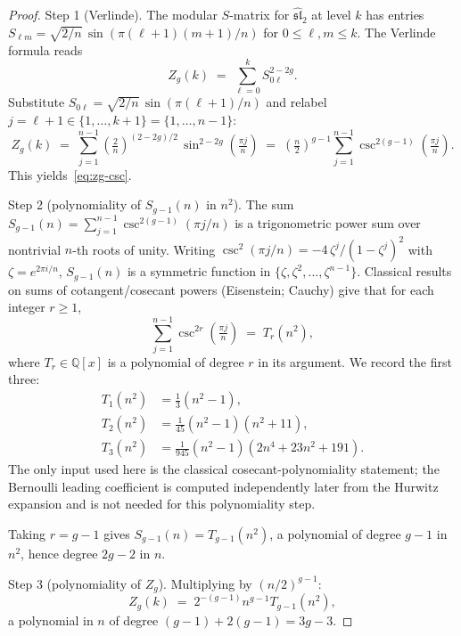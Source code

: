 \begin{proof}
Step 1 (Verlinde). The modular $S$-matrix for $\widehat{\mathfrak{sl}}_2$ at
level $k$ has entries $S_{\ell m} = \sqrt{2/n}\,\sin(\pi(\ell+1)(m+1)/n)$ for
$0 \le \ell, m \le k$. The Verlinde formula reads
\begin{equation}
Z_g(k) \;=\; \sum_{\ell=0}^{k} S_{0\ell}^{2-2g}.
\end{equation}
Substitute $S_{0\ell} = \sqrt{2/n}\,\sin(\pi(\ell+1)/n)$ and relabel
$j = \ell+1 \in \{1, \ldots, k+1\} = \{1, \ldots, n-1\}$:
\begin{equation}
Z_g(k) \;=\; \sum_{j=1}^{n-1} \left(\tfrac{2}{n}\right)^{(2-2g)/2}\,
\sin^{2-2g}\!\left(\tfrac{\pi j}{n}\right)
\;=\; \left(\tfrac{n}{2}\right)^{g-1}\sum_{j=1}^{n-1}\csc^{2(g-1)}\!\!\left(\tfrac{\pi j}{n}\right).
\end{equation}
This yields~\eqref{eq:zg-csc}. \checkmark

Step 2 (polynomiality of $S_{g-1}(n)$ in $n^2$). The sum
$S_{g-1}(n) = \sum_{j=1}^{n-1} \csc^{2(g-1)}(\pi j / n)$ is a trigonometric
power sum over nontrivial $n$-th roots of unity. Writing
$\csc^2(\pi j/n) = -4\,\zeta^j / (1 - \zeta^j)^2$ with
$\zeta = e^{2\pi i/n}$, $S_{g-1}(n)$ is a symmetric function in
$\{\zeta, \zeta^2, \ldots, \zeta^{n-1}\}$. Classical results on sums of
cotangent/cosecant powers (Eisenstein; Cauchy) give that for each integer
$r \ge 1$,
\begin{equation}
\sum_{j=1}^{n-1} \csc^{2r}\!\!\left(\tfrac{\pi j}{n}\right)
\;=\; T_r(n^2),
\end{equation}
where $T_r \in \mathbb{Q}[x]$ is a polynomial of degree $r$ in its argument.
We record the first three:
\begin{align}
T_1(n^2) &= \tfrac{1}{3}(n^2 - 1), \label{eq:T1} \\
T_2(n^2) &= \tfrac{1}{45}(n^2-1)(n^2+11), \label{eq:T2} \\
T_3(n^2) &= \tfrac{1}{945}(n^2-1)(2 n^4 + 23 n^2 + 191). \label{eq:T3}
\end{align}
The only input used here is the classical cosecant-polynomiality
statement; the Bernoulli leading coefficient is computed independently
later from the Hurwitz expansion and is not needed for this
polynomiality step.

Taking $r = g-1$ gives $S_{g-1}(n) = T_{g-1}(n^2)$, a polynomial of degree
$g - 1$ in $n^2$, hence degree $2g-2$ in $n$. \checkmark

Step 3 (polynomiality of $Z_g$). Multiplying by $(n/2)^{g-1}$:
\begin{equation}
Z_g(k) \;=\; 2^{-(g-1)} n^{g-1} T_{g-1}(n^2),
\end{equation}
a polynomial in $n$ of degree $(g-1) + 2(g-1) = 3g-3$. \checkmark
\end{proof}

